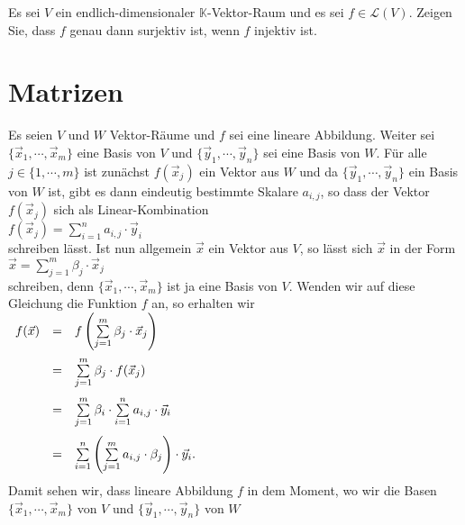 \exercise
Es sei $V$ ein endlich-dimensionaler $\mathbb{K}$-Vektor-Raum und es sei $f \in \mathcal{L}(V)$.
Zeigen Sie, dass $f$ genau dann surjektiv ist, wenn $f$ injektiv ist. \exend


\section{Matrizen}
Es seien $V$ und $W$ Vektor-R\"{a}ume und $f$ sei eine lineare Abbildung.  Weiter sei
$\{ \vec{x}_1, \cdots, \vec{x}_m \}$ eine Basis von $V$ und 
$\{ \vec{y}_1, \cdots, \vec{y}_n \}$ sei eine Basis von $W$.  F\"{u}r alle $j \in \{1,\cdots,m\}$ ist zun\"{a}chst
$f(\vec{x}_j)$ ein Vektor aus $W$ und da $\{ \vec{y}_1, \cdots, \vec{y}_n \}$ ein Basis von $W$ ist, 
gibt es dann eindeutig bestimmte Skalare $a_{i,j}$, so dass der Vektor $f(\vec{x}_j)$ sich als
Linear-Kombination 
\\[0.2cm]
\hspace*{1.3cm}
$f(\vec{x}_j) = \sum\limits_{i=1}^n a_{i,j} \cdot \vec{y}_i$
\\[0.2cm]
schreiben l\"{a}sst.  Ist nun allgemein $\vec{x}$ ein Vektor aus $V$, so l\"{a}sst sich $\vec{x}$ in der Form 
\\[0.2cm]
\hspace*{1.3cm}
$\vec{x} = \sum\limits_{j=1}^m \beta_j \cdot \vec{x}_j$
\\[0.2cm]
schreiben, denn $\{ \vec{x}_1, \cdots, \vec{x}_m \}$ ist ja eine Basis von $V$.  Wenden wir auf diese Gleichung die Funktion $f$ an, 
so erhalten wir
\\[0.2cm]
\hspace*{1.3cm}
$
\begin{array}[t]{lcl}
  f(\vec{x}) & = & f\left(\sum\limits_{j=1}^m \beta_j \cdot \vec{x}_j\right)                    \\[0.5cm]
                & = & \sum\limits_{j=1}^m \beta_j \cdot f(\vec{x}_j)                               \\[0.5cm]
                & = & \sum\limits_{j=1}^m \beta_i \cdot \sum\limits_{i=1}^n a_{i,j} \cdot \vec{y}_i \\[0.5cm]
                & = &  \sum\limits_{i=1}^n \left(\sum\limits_{j=1}^m a_{i,j} \cdot \beta_j\right) \cdot \vec{y}_i. \\[0.5cm]
\end{array}
$
\\[0.2cm]
Damit sehen wir, dass lineare Abbildung $f$ in dem Moment, wo wir die Basen
$\{ \vec{x}_1, \cdots, \vec{x}_m \}$ von $V$ und $\{ \vec{y}_1, \cdots, \vec{y}_n \}$ von $W$
